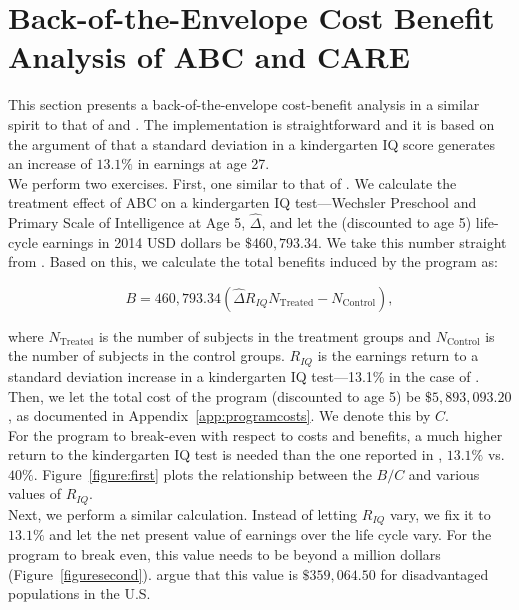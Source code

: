 
\section{Back-of-the-Envelope Cost Benefit Analysis of ABC and CARE} \label{appendix:back}

\noindent This section presents a back-of-the-envelope cost-benefit analysis in a similar spirit to that of \citet{Chetty_Friedman_etal_2010_HowDoesYour} and \citet{Kline-Walters_2015_NBER-Evaluating}. The implementation is straightforward and it is based on the argument of  \citet{Chetty_Friedman_etal_2010_HowDoesYour} that a standard deviation in a kindergarten IQ score generates an increase of $13.1\%$ in earnings at age 27.\\

\noindent We perform two exercises. First, one similar to that of \citet{Kline-Walters_2015_NBER-Evaluating}. We calculate the treatment effect of ABC on a kindergarten IQ test---Wechsler Preschool and Primary Scale of Intelligence at Age 5, $\widehat{\Delta}$, and let the (discounted to age 5) life-cycle earnings in 2014 USD dollars be $\$460,793.34$. We take this number straight from \citet{Kline-Walters_2015_NBER-Evaluating}. Based on this, we calculate the total benefits induced by the program as: 

\begin{equation}
B = 460,793.34 \left( \widehat{\Delta} R_{IQ}  N_{\text{Treated}}  -  N_{\text{Control}} \right) , 
\end{equation}

\noindent where $N_{\text{Treated}}$ is the number of subjects in the treatment groups and $N_{\text{Control}}$ is the number of subjects in the control groups. $R_{IQ}$ is the earnings return to a standard deviation increase in a kindergarten IQ test---13.1\% in the case of \citep{Chetty_Friedman_etal_2010_HowDoesYour}. Then, we let the total cost of the program (discounted to age 5) be $\$5,893,093.20$, as documented in Appendix~\ref{app:programcosts}. We denote this by $C$.\\ 

\noindent For the program to break-even with respect to costs and benefits, a much higher return to the kindergarten IQ test is needed than the one reported in \citep{Chetty_Friedman_etal_2010_HowDoesYour}, $13.1\%$ vs. $40\%$. Figure~\ref{figure:first} plots the relationship between the $B/C$ and various values of $R_{IQ}$.\\ 

\noindent Next, we perform a similar calculation. Instead of letting $R_{IQ}$ vary, we fix it to $13.1\%$ and let the net present value of earnings over the life cycle vary. For the program to break even, this value needs to be beyond a million dollars (Figure~\ref{figuresecond}). \citet{Kline-Walters_2015_NBER-Evaluating} argue that this value is $\$359,064.50$ for disadvantaged populations in the U.S.


